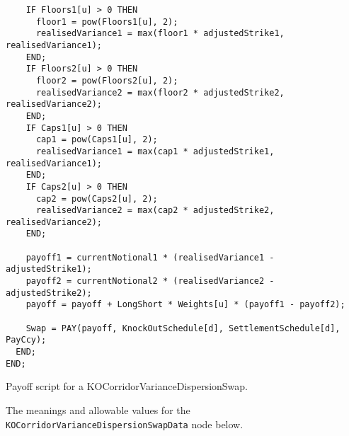 \begin{listing}[hbt]
\begin{verbatim}
    IF Floors1[u] > 0 THEN
      floor1 = pow(Floors1[u], 2);
      realisedVariance1 = max(floor1 * adjustedStrike1, realisedVariance1);
    END;
    IF Floors2[u] > 0 THEN
      floor2 = pow(Floors2[u], 2);
      realisedVariance2 = max(floor2 * adjustedStrike2, realisedVariance2);
    END;
    IF Caps1[u] > 0 THEN
      cap1 = pow(Caps1[u], 2);
      realisedVariance1 = max(cap1 * adjustedStrike1, realisedVariance1);
    END;
    IF Caps2[u] > 0 THEN
      cap2 = pow(Caps2[u], 2);
      realisedVariance2 = max(cap2 * adjustedStrike2, realisedVariance2);
    END;

    payoff1 = currentNotional1 * (realisedVariance1 - adjustedStrike1);
    payoff2 = currentNotional2 * (realisedVariance2 - adjustedStrike2);
    payoff = payoff + LongShort * Weights[u] * (payoff1 - payoff2);

    Swap = PAY(payoff, KnockOutSchedule[d], SettlementSchedule[d], PayCcy);
  END;
END;
\end{verbatim}
\caption{Payoff script for a KOCorridorVarianceDispersionSwap.}
\label{lst:ko_corridor_variance_dispersion_swap}
\end{listing}

The meanings and allowable values for the \lstinline!KOCorridorVarianceDispersionSwapData! node below.

